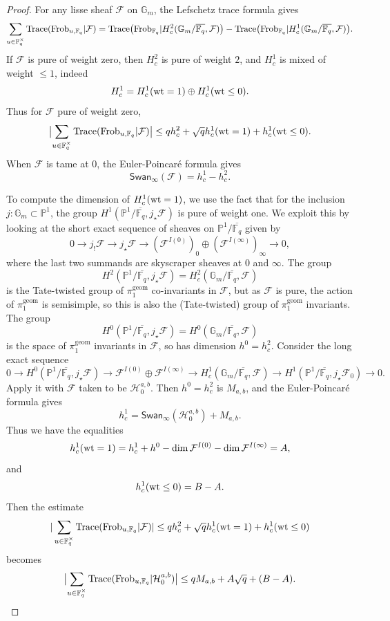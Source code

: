 \documentclass[11pt]{amsart}
\theoremstyle{plain}
\theoremstyle{definition}
\numberwithin{thm}{section}
\numberwithin{equation}{thm}
\newcommand{\Trace}{{\rm Trace}}
\newcommand{\Swan}{\mathsf {Swan}}
\newcommand{\sF}{{\mathcal F}}
\newcommand{\sH}{{\mathcal H}}
\newcommand{\F}{{\mathbb F}}
\newcommand{\G}{{\mathbb G}}
\renewcommand{\P}{{\mathbb P}}
\newcommand{\0}{\emptyset}
\newcommand{\geo}{{\mathrm {geom}}}
\newcommand{\Frob}{\mathrm{Frob}}
\begin{document}
\begin{proof}For any lisse sheaf $\sF$ on $\G_m$, the Lefschetz trace formula gives
$$\sum_{u \in \F_q^\times}\Trace(\Frob_{u,\F_q}|\sF) =\Trace\bigl(\Frob_{\F_q}|H^2_c(\G_m/\overline{\F_q},\sF)\bigr)-\Trace\bigl(\Frob_{\F_q}|H^1_c(\G_m/\overline{\F_q},\sF)\bigr).$$
If $\sF$ is pure of weight zero, then $H^2_c$ is pure of weight $2$, and $H^1_c$ is mixed of weight $\le 1$, indeed
$$H^1_c = H^1_c({\rm {wt}}=1) \oplus H^1_c({\rm {wt}} \le 0).$$
Thus for $\sF$ pure of weight zero, %
$$\bigl{|}\sum_{u \in \F_q^\times}\Trace(\Frob_{u,\F_q}|\sF)\bigr{|} \le qh^2_c + \sqrt{q}h^1_c({\rm {wt}}=1) +h^1_c({\rm {wt}} \le 0)  .$$
When $\sF$ is tame at $0$, the Euler-Poincar\'{e} formula gives
$$\Swan_\infty(\sF) = h^1_c - h^2_c.$$

To compute the dimension of $H^1_c({\rm {wt}}=1)$, we use the fact that for the inclusion $j:\G_m \subset \P^1$, the group
$H^1(\P^1/\overline{\F_q},j_\star \sF)$ is pure of weight one. We exploit this by looking at the short exact sequence of sheaves
on $\P^1/\overline{\F_q}$ given by
$$0 \rightarrow j_!\sF \rightarrow j_\star \sF \rightarrow (\sF^{I(0)})_0 \oplus (\sF^{I(\infty)})_\infty \rightarrow 0,$$
where the last two summands are skyscraper sheaves at $0$ and $\infty$. The group 
$$H^2(\P^1/\overline{\F_q},j_\star \sF)=H^2_c(\G_m/\overline{\F_q},\sF)$$
is the Tate-twisted group of $\pi_1^{\geo}$ co-invariants in $\sF$, but as $\sF$ is pure, the action of $\pi_1^{\geo}$ is semisimple, so this is also the (Tate-twisted) group of $\pi_1^{\geo}$ invariants.
The group
$$H^0(\P^1/\overline{\F_q},j_\star \sF)=H^0(\G_m/\overline{\F_q},\sF)$$
is the space of $\pi_1^{\geo}$ invariants in $\sF$, so has dimension $h^0=h^2_c$. Consider the long exact sequence
$$0 \rightarrow H^0(\P^1/\overline{\F_q},j_\star \sF) \rightarrow \sF^{I(0)} \oplus \sF^{I(\infty)} \rightarrow H^1_c(\G_m/\overline{\F_q},\sF) \rightarrow H^1(\P^1/\overline{\F_q},j_\star\sF_0) \rightarrow 0.$$
Apply it with $\sF$ taken to be $\sH_0^{a,b}$. Then $h^ 0=h_c^2$ is $M_{a,b}$, and the Euler-Poincar\'{e} formula gives
$$h_c^1 =\Swan_\infty(\sH_0^{a,b}) + M_{a,b}.$$
Thus we have the equalities
$$h^1_c({\rm {wt}}=1)=h^1_c +h^0 -\dim  \sF^{I(0)} - \dim  \sF^{I(\infty)}=A,$$
and
$$h^1_c({\rm {wt}} \le 0)=B-A.$$
Then the estimate
$$|\sum_{u \in \F_q^\times}\Trace(\Frob_{u,\F_q}|\sF) |  \le qh^2_c + \sqrt{q}h^1_c({\rm {wt}}=1) +h^1_c({\rm {wt}} \le 0)$$
becomes
$$\bigl{|}\sum_{u \in \F_q^\times}\Trace(\Frob_{u,\F_q}|\sH_0^{a,b})\bigr{|} \le q M_{a,b}  +A\sqrt{q} + (B-A).$$
\end{proof}
\end{document}
